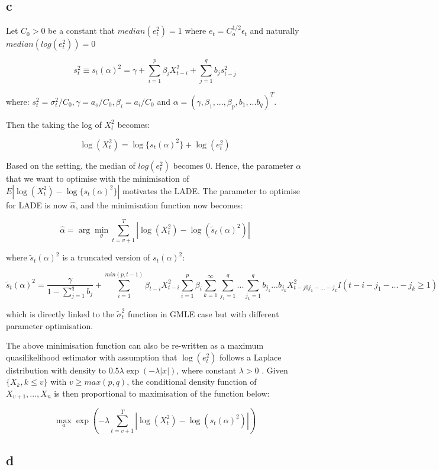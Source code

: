 \documentclass[
  11pt,
]{article}
\begin{document}
\hypertarget{c}{%
\subsection{c}\label{c}}

Let \(C_0>0\) be a constant that \(median(e_t^2)=1\) where
\(e_t=C_o^{1/2}\epsilon_t\) and naturally \(median(log(e_t^2))=0\)

\[s_t^2\equiv s_t(\alpha)^2= \gamma + \sum^{p}_{i=1}\beta_{i}X^2_{t-i}+\sum^{q}_{j=1}b_{j} s^2_{t-j}\]

where: \(s_t^2=\sigma_t^2/C_0, \gamma = a_o/C_0, \beta_i=a_i/C_0\) and
\(\alpha=(\gamma, \beta_1,...,\beta_p, b_1,...b_q)^T\).

Then the taking the log of \(X_t^2\) becomes:

\[\log(X_t^2)=\log \lbrace s_t(\alpha)^2 \rbrace +\log(e_t^2)\]

Based on the setting, the median of \(log(e_t^2)\) becomes 0. Hence, the
parameter \(\alpha\) that we want to optimise with the minimisation of
\(E|\log(X_t^2)-\log \lbrace s_t(\alpha)^2 \rbrace|\) motivates the
LADE. The parameter to optimise for LADE is now \(\hat\alpha\), and the
minimisation function now becomes:

\[\hat{\alpha}=\arg\min_{\theta}\sum^{T}_{t=v+1}|\log (X_{t}^2)-\log(\tilde s_t(\alpha)^2)|\]

where \(\tilde s_t(\alpha)^2\) is a truncated version of
\(s_t(\alpha)^2\):

\[\tilde s_t(\alpha)^2 =\frac{\gamma}{1-\sum^{q}_{j=1}b_{j}}+ \sum_{i=1}^{min(p,t-1)} \beta_{t-i}X_{t-i}^2\sum^{p}_{i=1}\beta_{i}\sum^{\infty}_{k=1}\sum^{q}_{j_1=1}...\sum^{q}_{j_k=1}b_{j_1}...b_{j_k}X^2_{t-j0j_1-...-j_k}I(t-i-j_1-...-j_k\ge1)\]

which is directly linked to the \(\tilde\sigma_t^2\) function in GMLE
case but with different parameter optimisation.

The above minimisation function can also be re-written as a maximum
quasilikelihood estimator with assumption that \(\log(e_t^2)\) follows a
Laplace distribution with density to \(0.5\lambda \exp(-\lambda|x|)\),
where constant \(\lambda>0\) . Given \(\{X_k,k\le v\}\) with
\(v \ge max(p,q)\), the conditional density function of
\(X_{v+1},...,X_n\) is then proportional to maximisation of the function
below:

\[\max_{a} \exp(-\lambda \sum^{T}_{t=v+1}|\log (X_{t}^2)-\log( s_t(\alpha)^2)|)\]

\hypertarget{d}{%
\subsection{d}\label{d}}
\end{document}
